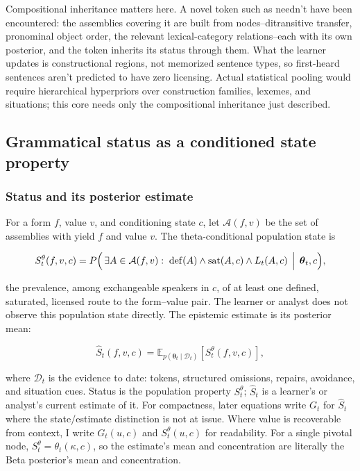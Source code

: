 Compositional inheritance matters here. A novel token such as  needn't have been encountered: the assemblies covering it
are built from nodes--ditransitive transfer, pronominal object order, the relevant
lexical-category relations--each with its own posterior, and the token inherits its
status through them. What the learner updates is constructional regions, not
memorized sentence types, so first-heard sentences aren't predicted to have zero
licensing. Actual statistical pooling would require hierarchical hyperpriors
over construction families, lexemes, and situations; this core needs only
the compositional inheritance just described.

\subsection{Grammatical status as a conditioned state property}
\label{sec:objective-G}

\subsubsection{Status and its posterior estimate}
\label{sec:posterior-existence}

For a form $f$, value $v$, and conditioning state $c$, let $\mathcal{A}(f,v)$ be
the set of assemblies with yield $f$ and value $v$. The theta-conditional
population state is

\begin{equation}
S_t^{\theta}(f,v,c)=
P\Bigl(\,\exists A\in\mathcal{A}(f,v):\;
\operatorname{def}(A)\wedge\operatorname{sat}(A,c)\wedge L_t(A,c)
\,\Bigm|\,\boldsymbol{\theta}_t,c\Bigr),
\label{eq:Gtheta}
\end{equation}

\noindent the prevalence, among exchangeable speakers in $c$, of at least one
defined, saturated, licensed route to the form--value pair. The learner or
analyst does not observe this population state directly. The epistemic estimate
is its posterior mean:

\begin{equation}
\widehat{S}_t(f,v,c)=
\mathbb{E}_{p(\boldsymbol{\theta}_t\mid\mathcal{D}_t)}
\!\left[S_t^{\theta}(f,v,c)\right],
\label{eq:Gt}
\end{equation}

\noindent where $\mathcal{D}_t$ is the evidence to date: tokens, structured
omissions, repairs, avoidance, and situation cues. Status is the population
property $S_t^{\theta}$; $\widehat{S}_t$ is a learner's or analyst's current
estimate of it. For compactness, later equations write $G_t$ for
$\widehat{S}_t$ where the state/estimate distinction is not at issue. Where
value is recoverable from context, I write $G_t(u,c)$ and $S_t^{\theta}(u,c)$
for readability. For a single pivotal node,
$S_t^{\theta}=\theta_t(\kappa,c)$, so the estimate's mean and concentration are
literally the Beta posterior's mean and concentration.

